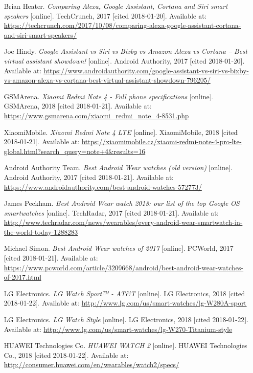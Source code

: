 \begin{thebibliography}{10}
Brian Heater. \textit{Comparing Alexa, Google Assistant, Cortana and Siri smart speakers} [online]. TechCrunch, 2017 [cited 2018-01-20]. Available at: \url{https://techcrunch.com/2017/10/08/comparing-alexa-google-assistant-cortana-and-siri-smart-speakers/}

Joe Hindy. \textit{Google Assistant vs Siri vs Bixby vs Amazon Alexa vs Cortana – Best virtual assistant showdown!} [online]. Android Authority, 2017 [cited 2018-01-20]. Available at: \url{https://www.androidauthority.com/google-assistant-vs-siri-vs-bixby-vs-amazon-alexa-vs-cortana-best-virtual-assistant-showdown-796205/}

GSMArena. \textit{Xiaomi Redmi Note 4 - Full phone specifications} [online]. GSMArena, 2018 [cited 2018-01-21]. Available at: \url{https://www.gsmarena.com/xiaomi_redmi_note_4-8531.php}

XiaomiMobile. \textit{Xiaomi Redmi Note 4 LTE} [online]. XiaomiMobile, 2018 [cited 2018-01-21]. Available at: \url{https://xiaomimobile.cz/xiaomi-redmi-note-4-pro-lte-global.html?search_query=note+4&results=16}

Android Authority Team. \textit{Best Android Wear watches (old version)} [online]. Android Authority, 2017 [cited 2018-01-21]. Available at: \url{https://www.androidauthority.com/best-android-watches-572773/}

James Peckham. \textit{Best Android Wear watch 2018: our list of the top Google OS smartwatches} [online]. TechRadar, 2017 [cited 2018-01-21]. Available at: \url{http://www.techradar.com/news/wearables/every-android-wear-smartwatch-in-the-world-today-1288283}

Michael Simon. \textit{Best Android Wear watches of 2017} [online]. PCWorld, 2017 [cited 2018-01-21]. Available at: \url{https://www.pcworld.com/article/3209668/android/best-android-wear-watches-of-2017.html}

LG Electronics. \textit{LG Watch Sport™ - AT\&T} [online]. LG Electronics, 2018 [cited 2018-01-22]. Available at: \url{http://www.lg.com/us/smart-watches/lg-W280A-sport}

LG Electronics. \textit{LG Watch Style} [online]. LG Electronics, 2018 [cited 2018-01-22]. Available at: \url{http://www.lg.com/us/smart-watches/lg-W270-Titanium-style}

HUAWEI Technologies Co. \textit{HUAWEI WATCH 2} [online]. HUAWEI Technologies Co., 2018 [cited 2018-01-22]. Available at: \url{http://consumer.huawei.com/en/wearables/watch2/specs/}


\end{thebibliography}
